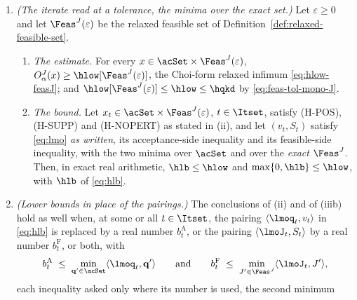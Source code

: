 \begin{theorem}
\begin{enumerate}[label=(\roman*),leftmargin=2.2em]
\begin{itemize}[leftmargin=2.6em]
  built from them is applied before the gradient is taken.
\end{itemize}
Let $(v_t,S_t)$ satisfy both inequalities of \eqref{eq:lmo} at
$(\lmoq_t,\lmoJ_t)$ (Definition~\ref{def:first-order-setting}): the
 and the
.
Then, \emph{in exact real arithmetic},
\begin{equation}\label{eq:hlb}
  \hlb\;\coloneqq\;\max_{t\in\Itset}\Big[
  O^{J}_{\alpha}(x_t)
  +\langle\lmoq_t,v_t-\mathbf q_t\rangle
  +\langle\lmoJ_t,S_t-J_t\rangle\Big]
  \;\le\;\hlow ,
\end{equation}
and $\max\{0,\hlb\}\le\hlow$ as well.
\item \emph{(The iterate read at a tolerance, the minima over the exact
set.)} Let $\varepsilon\ge0$ and let $\Feas^{J}(\varepsilon)$ be the
relaxed feasible set of Definition~\ref{def:relaxed-feasible-set}.
\begin{enumerate}[label=(iii\alph*),leftmargin=2.4em]
\item \emph{The estimate.} For every
$x\in\acSet\times\Feas^{J}(\varepsilon)$,
$O^{J}_{\alpha}(x)\ge\hlow[\Feas^{J}(\varepsilon)]$, the Choi-form
relaxed infimum \eqref{eq:hlow-feasJ}; and
$\hlow[\Feas^{J}(\varepsilon)]\le\hlow\le\hqkd$ by
\eqref{eq:feas-tol-mono-J}.
\item \emph{The bound.} Let $x_t\in\acSet\times\Feas^{J}(\varepsilon)$,
$t\in\Itset$, satisfy (H-POS), (H-SUPP) and (H-NOPERT) as stated in (ii),
and let $(v_t,S_t)$ satisfy \eqref{eq:lmo} \emph{as written}, its
acceptance-side inequality and its feasible-side inequality, with the two
minima over $\acSet$ and over the \emph{exact} $\Feas^{J}$. Then, in exact
real arithmetic,
$\hlb\le\hlow$ and $\max\{0,\hlb\}\le\hlow$, with $\hlb$ of
\eqref{eq:hlb}.
\end{enumerate}
\item \emph{(Lower bounds in place of the pairings.)} The conclusions of
(ii) and of (iiib) hold as well when, at some or all $t\in\Itset$, the
pairing $\langle\lmoq_t,v_t\rangle$ in \eqref{eq:hlb} is replaced by a real
number $b^{\mathrm A}_t$, or the pairing $\langle\lmoJ_t,S_t\rangle$ by a
real number $b^{\mathrm F}_t$, or both, with
\begin{equation}\label{eq:lmo-bounds}
  b^{\mathrm A}_t\;\le\;\min_{\mathbf q'\in\acSet}\langle\lmoq_t,\mathbf q'\rangle
  \qquad\text{and}\qquad
  b^{\mathrm F}_t\;\le\;\min_{J'\in\Feas^{J}}\langle\lmoJ_t,J'\rangle ,
\end{equation}
each inequality asked only where its number is used, the second minimum

\end{enumerate}
\end{theorem}
